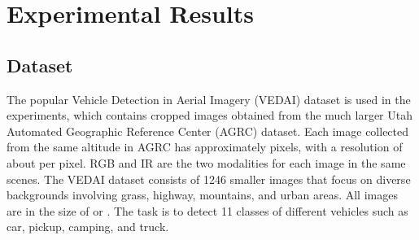 \section{Experimental Results}
\label{sec:Experiment}


\subsection{Dataset}
The popular Vehicle Detection in Aerial Imagery (VEDAI) dataset  \cite{razakarivony2016vehicle} is used in the experiments, which contains cropped images obtained from the much larger Utah Automated Geographic Reference Center (AGRC) dataset. Each image collected from the same altitude in AGRC has approximately  pixels, with a resolution of about  per pixel. RGB and IR are the two modalities for each image in the same scenes. The VEDAI dataset consists of 1246 smaller images that focus on diverse backgrounds involving grass, highway, mountains, and urban areas. All images are in the size of  or . The task is to detect 11 classes of different vehicles such as car, pickup, camping, and truck. 







